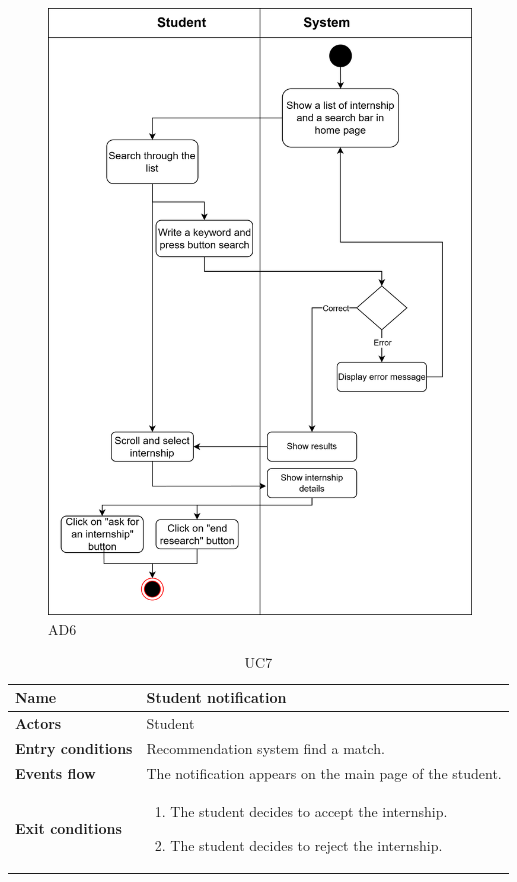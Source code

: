 \begin{figure}[H]
    \centering
    \includegraphics[width=1\linewidth]{Images/UseCasesDiagrams-Student search.png}
    \caption{AD6}
    \label{AD6}
\end{figure}

\begin{table}[H]
\renewcommand\arraystretch{1.25}
    \centering
    \begin{tabular}{|l|p{12 cm}|}
    \hline
    \textbf{Name} & Student notification\\
    \hline
    \textbf{Actors} & Student\\
    \hline
    \textbf{Entry conditions} & Recommendation system find a match.\\
    \hline
    \textbf{Events flow} & The notification appears on the main page of the student.\\  
    \hline
    \textbf{Exit conditions} & 
    \begin{enumerate}[label=(\alph*)]
        \item The student decides to accept the internship.
        \item The student decides to reject the internship.
    \end{enumerate}\\
    \hline
    \end{tabular}
    \caption{UC7}
    \label{UC7}
\end{table}

